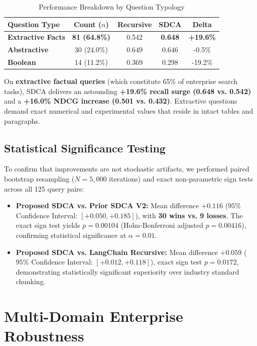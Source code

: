 \documentclass[conference]{IEEEtran}
\begin{document}
\begin{table}[h]
\centering
\caption{Performance Breakdown by Question Typology}
\label{tab:qtype}
\begin{tabular}{lcccc}
\toprule
\textbf{Question Type} & \textbf{Count ($n$)} & \textbf{Recursive} & \textbf{SDCA} & \textbf{Delta} \\
\midrule
\textbf{Extractive Facts} & \textbf{81 (64.8\%)} & 0.542 & \textbf{0.648} & \textbf{+19.6\%} \\
\textbf{Abstractive} & 30 (24.0\%) & 0.649 & 0.646 & -0.5\% \\
\textbf{Boolean} & 14 (11.2\%) & 0.369 & 0.298 & -19.2\% \\
\bottomrule
\end{tabular}
\end{table}

On \textbf{extractive factual queries} (which constitute 65\% of enterprise search tasks), SDCA delivers an astounding \textbf{+19.6\% recall surge (0.648 vs. 0.542)} and a \textbf{+16.0\% NDCG increase (0.501 vs. 0.432)}. Extractive questions demand exact numerical and experimental values that reside in intact tables and paragraphs.

\subsection{Statistical Significance Testing}
To confirm that improvements are not stochastic artifacts, we performed paired bootstrap resampling ($N = 5,000$ iterations) and exact non-parametric sign tests across all 125 query pairs:
\begin{itemize}
    \item \textbf{Proposed SDCA vs. Prior SDCA V2:} Mean difference $+0.116$ ($95\%$ Confidence Interval: $[+0.050, +0.185]$), with \textbf{30 wins vs. 9 losses}. The exact sign test yields \textbf{$p = 0.00104$} (Holm-Bonferroni adjusted $p = 0.00416$), confirming statistical significance at $\alpha = 0.01$.
    \item \textbf{Proposed SDCA vs. LangChain Recursive:} Mean difference $+0.059$ ($95\%$ Confidence Interval: $[+0.012, +0.118]$), exact sign test $p = 0.0172$, demonstrating statistically significant superiority over industry standard chunking.
\end{itemize}

\section{Multi-Domain Enterprise Robustness}
\end{document}
